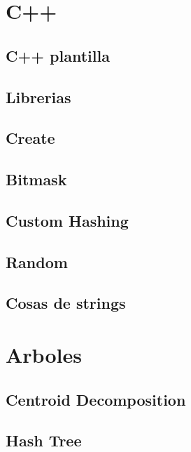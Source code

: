\section{C++}
\subsection{C++ plantilla}
\raggedbottom
\hrulefill
\subsection{Librerias}
\raggedbottom
\hrulefill
\subsection{Create}
\raggedbottom
\hrulefill
\subsection{Bitmask}
\raggedbottom
\hrulefill
\subsection{Custom Hashing}
\raggedbottom
\hrulefill
\subsection{Random}
\raggedbottom
\hrulefill
\subsection{Cosas de strings}
\raggedbottom
\hrulefill

\section{Arboles}
\subsection{Centroid Decomposition}
\raggedbottom
\hrulefill
\subsection{Hash Tree}
\raggedbottom
\hrulefill
